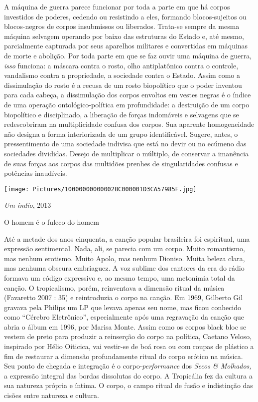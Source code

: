 A máquina de guerra parece funcionar por toda a parte em que há corpos
investidos de poderes, cedendo ou resistindo a eles, formando
blocos-sujeitos ou blocos-negros de corpos insubmissos ou liberados.
Trata-se sempre da mesma máquina selvagem operando por baixo das
estruturas do Estado e, até mesmo, parcialmente capturada por seus
aparelhos militares e convertidas em máquinas de morte e abolição. Por
toda parte em que se faz ouvir uma máquina de guerra, \emph{isso
}funciona: a máscara contra o rosto, olho antiplatônico contra o
controle, vandalismo contra a propriedade, a sociedade contra o Estado.
Assim como a dissimulação do rosto é a recusa de um rosto biopolítico
que o poder inventou para cada cabeça, a dissimulação dos corpos
envoltos em vestes negras é o índice de uma operação ontológico-política
em profundidade: a destruição de um corpo biopolítico e disciplinado, a
liberação de forças indomáveis e selvagens que se redescobriram na
multiplicidade confusa dos corpos. Sua aparente homogeneidade não
designa a forma interiorizada de um grupo identificável. Sugere, antes,
o pressentimento de uma sociedade indivisa que está no devir ou no
ecúmeno das sociedades divididas. Desejo de multiplicar o múltiplo, de
conservar a imanência de suas forças aos corpos das multidões prenhes de
singularidades confusas e potências inaudíveis.

\texttt{[image: Pictures/10000000000002BC000001D3CA57985F.jpg]}

\emph{Um índio}, 2013

O homem é o fuleco do homem

Até a metade dos anos cinquenta, a canção popular brasileira foi
espiritual, uma expressão sentimental. Nada, ali, se parecia com um
corpo. Muito romantismo, mas nenhum erotismo. Muito Apolo, mas nenhum
Dioniso. Muita beleza clara, mas nenhuma obscura embriaguez. A voz
sublime dos cantores da era do rádio formava um código expressivo e, ao
mesmo tempo, uma metonímia total da canção. O tropicalismo, porém,
reinventava a dimensão ritual da música (Favaretto 2007 : 35) e
reintroduzia o corpo na canção. Em 1969, Gilberto Gil gravava pela
Philips um LP que levava apenas seu nome, mas ficou conhecido como
``Cérebro Eletrônico'', especialmente após uma regravação da canção que
abria o álbum em 1996, por Marisa Monte. Assim como os corpos black bloc
se vestem de preto para produzir a reinserção do corpo na política,
Caetano Veloso, inspirado por Hélio Oiticica, vai vestir-se de boá rosa
ou com roupas de plástico a fim de restaurar a dimensão profundamente
ritual do corpo erótico na música. Seu ponto de chegada e integração é o
corpo-\emph{performance }dos \emph{Secos \& Molhados, }a expressão
integral das bordas dissolutas do corpo. A Tropicália fez da cultura a
sua natureza própria e íntima. O corpo, o campo ritual de fusão e
indistinção das cisões entre natureza e cultura.

